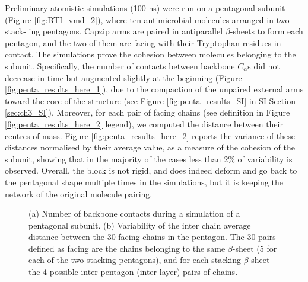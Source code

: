 Preliminary atomistic simulations (100 ns) were run on a pentagonal subunit (Figure \ref{fig:BTI_vmd_2}), where ten antimicrobial molecules arranged in two stack-
ing pentagons. Capzip arms are paired in antiparallel $\beta$-sheets to form each
pentagon, and the two of them are facing with their Tryptophan residues in contact.
%
The simulations prove the cohesion between molecules belonging to the subunit. Specifically, the number of contacts between backbone $C_\alpha$s did not decrease in time but augmented slightly at the beginning (Figure \ref{fig:penta_results_here_1}), due to the compaction of the unpaired external arms toward the core of the structure (see Figure \ref{fig:penta_results_SI} in SI Section \ref{sec:ch3_SI}).
%
Moreover, for each pair of facing chains (see definition in Figure \ref{fig:penta_results_here_2} legend), we computed the distance between their centres of mass. Figure \ref{fig:penta_results_here_2} reports the variance of these distances normalised by their average value, as a measure of the cohesion of the subunit, showing that in the majority of the cases less than 2\% of variability is observed. Overall, the block is not rigid, and does indeed deform and go back to the pentagonal shape multiple times in the simulations, but it is keeping the network of the original molecule pairing.
\begin{figure}[t]
\centering
{}
\caption[Cohesion measures on the pentagonal subunit]{(a) Number of backbone contacts during a simulation of a pentagonal subunit. (b) Variability of the inter chain average distance between the 30 facing chains in the pentagon. The 30 pairs defined as facing are the chains belonging to the same $\beta$-sheet (5 for each of the two stacking pentagons), and for each stacking $\beta$-sheet the 4 possible inter-pentagon (inter-layer) pairs of chains.}
\label{fig:penta_results_here}
\end{figure}

